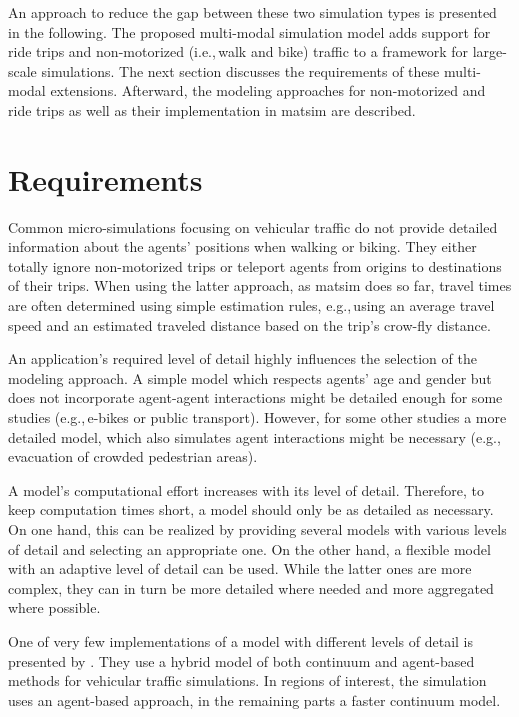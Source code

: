 An approach to reduce the gap between these two simulation types is presented in the following. The proposed multi-modal simulation model adds support for ride trips and non-motorized (i.e.,\,walk and bike) traffic to a framework for large-scale simulations. The next section discusses the requirements of these multi-modal extensions. Afterward, the modeling approaches for non-motorized and ride trips as well as their implementation in \gls{matsim} are described.

\section{Requirements}
Common micro-simulations focusing on vehicular traffic do not provide detailed information about the agents' positions when walking or biking. They either totally ignore non-motorized trips or \gls{teleport} agents from origins to destinations of their trips. When using the latter approach, as \gls{matsim} does so far, travel times are often determined using simple estimation rules, e.g.,\,using an average travel speed and an estimated traveled distance based on the trip's crow-fly distance.

An application's required level of detail highly influences the selection of the modeling approach. A simple model which respects agents' age and gender but does not incorporate agent-agent interactions might be detailed enough for some studies (e.g.,\,e-bikes or public transport). However, for some other studies a more detailed model, which also simulates agent interactions might be necessary (e.g.,\,evacuation of crowded pedestrian areas).

A model's computational effort increases with its level of detail. Therefore, to keep computation times short, a model should only be as detailed as necessary. On one hand, this can be realized by providing several models with various levels of detail and selecting an appropriate one. On the other hand, a flexible model with an adaptive level of detail can be used. While the latter ones are more complex, they can in turn be more detailed where needed and more aggregated where possible.

One of very few implementations of a model with different levels of detail is presented by \citet{SewallJEtAl_ACMTG_2011}. They use a hybrid model of both continuum and agent-based methods for vehicular traffic simulations. In regions of interest, the simulation uses an agent-based approach, in the remaining parts a faster continuum model.

